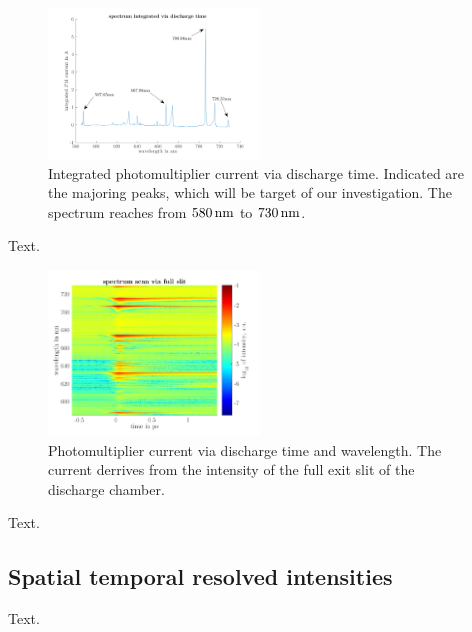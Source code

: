 \documentclass[a4paper,10pt]{article}
\begin{document}
				\begin{figure}[h]
					\centering
					\includegraphics[width=0.5\textwidth]{figures/results/spectrum/int_spectrum.pdf}
					\caption{Integrated photomultiplier current via discharge time. Indicated are the majoring peaks, which will be target of our investigation. The spectrum reaches from $\unit[580]{nm}$ to $\unit[730]{nm}$.}
					\label{img:int_spectrum}
				\end{figure}
				
			Text.
				
				\begin{figure}[h]
					\centering
					\includegraphics[width=0.5\textwidth]{figures/results/spectrum/spectrum.pdf}
					\caption{Photomultiplier current via discharge time and wavelength. The current derrives from the intensity of the full exit slit of the discharge chamber.}
					\label{img:full_spectrum}
				\end{figure}
				
			Text.
		
		\subsection{Spatial temporal resolved intensities}
		
			Text.
			
		\onecolumn
					
\end{document}
